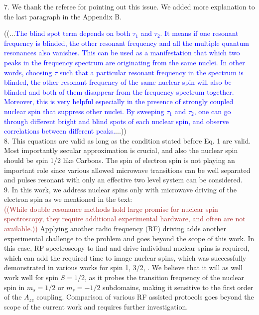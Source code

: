 \documentclass[12pt]{amsart}
\begin{document}
	7. We thank the referee for pointing out this issue. We added more explanation to the last paragraph in the Appendix B.
	
	((...\textcolor{blue}{The blind spot term depends on both $\tau_1$ and $\tau_2$. It means if one resonant frequency is blinded, the other resonant frequency and all the multiple quantum resonances also vanishes. This can be used as a manifestation that which two peaks in the frequency spectrum are originating from the same nuclei. In other words, choosing $\tau$ such that a particular resonant frequency in the spectrum is blinded, the other resonant frequency of the same nuclear spin will also be blinded and both of them disappear from the frequency spectrum together. Moreover, this is very helpful especially in the presence of strongly coupled nuclear spin that suppress other nuclei. By sweeping $\tau_1$ and $\tau_2$, one can go through different bright and blind spots of each nuclear spin, and observe correlations between different peaks.}...))\\
	
	8. This equations are valid as long as the condition stated before Eq. 1 are valid. Most importantly secular approximation is crucial, and also the nuclear spin should be spin 1/2 like Carbons. The spin of electron spin is not playing an important role since various allowed microwave transitions can be well separated and pulses resonant with only an effective two level system can be considered.\\
	
	9. In this work, we address nuclear spins only with microwave driving of the electron spin as we mentioned in the text:\\
	\textcolor{brown}{((While double resonance methods hold large promise for nuclear spin spectroscopy, they require additional experimental hardware, and often are not available.))}
	Applying another radio frequency (RF) driving adds another experimental challenge to the problem and goes beyond the scope of this work. In this case, RF spectroscopy to find and drive individual nuclear spins is required, which can add the required time to image nuclear spins, which was successfully demonstrated in various works for spin 1, 3/2,  \cite{DDRF, ENDOR, SSRV2}. We believe that it will as well work well for spin $S=1/2$, as it probes the transition frequency of the nuclear spin in $m_s=1/2$ or $m_s=-1/2$ subdomains, making it sensitive to the first order of the $A_{zz}$ coupling. Comparison of various RF assisted protocols goes beyond the scope of the current work and requires further investigation.\\
\end{document}
